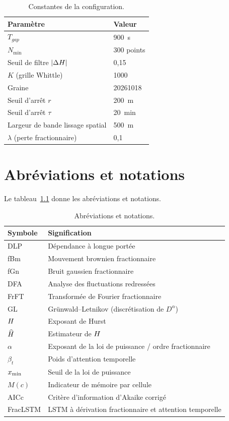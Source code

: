 \begin{table}[H]
\centering
\caption{Constantes de la configuration.}
\label{tab:parametres}
\begin{tabular}{ll}
\toprule
Paramètre & Valeur \\
\midrule
$T_{gap}$ & 900~s \\
$N_{\min}$ & 300 points \\
Seuil de filtre $|\Delta H|$ & 0,15 \\
$K$ (grille Whittle) & 1000 \\
Graine & 20261018 \\
Seuil d'arrêt $r$ & 200~m \\
Seuil d'arrêt $\tau$ & 20~min \\
Largeur de bande lissage spatial & 500~m \\
$\lambda$ (perte fractionnaire) & 0,1 \\
\bottomrule
\end{tabular}
\end{table}

\chapter{Abréviations et notations}
\label{ann:abreviations}
Le tableau~\ref{tab:abreviations} donne les abréviations et notations.

\begin{table}[H]
\centering
\caption{Abréviations et notations.}
\label{tab:abreviations}
\begin{tabular}{ll}
\toprule
Symbole & Signification \\
\midrule
DLP & Dépendance à longue portée \\
fBm & Mouvement brownien fractionnaire \\
fGn & Bruit gaussien fractionnaire \\
DFA & Analyse des fluctuations redressées \\
FrFT & Transformée de Fourier fractionnaire \\
GL & Grünwald--Letnikov (discrétisation de $D^\alpha$) \\
$H$ & Exposant de Hurst \\
$\widehat{H}$ & Estimateur de $H$ \\
$\alpha$ & Exposant de la loi de puissance / ordre fractionnaire \\
$\beta_t$ & Poids d'attention temporelle \\
$x_{\min}$ & Seuil de la loi de puissance \\
$M(c)$ & Indicateur de mémoire par cellule \\
AICc & Critère d'information d'Akaike corrigé \\
FracLSTM & LSTM à dérivation fractionnaire et attention temporelle \\
\bottomrule
\end{tabular}
\end{table}

